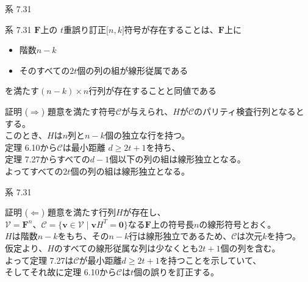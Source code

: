 \documentclass[dvipdfmx,10pt,jsarticle]{beamer}
\newcommand{\F}{\mathbf{F}}
\newcommand{\code}[1]{\mathcal{#1}}
\newcommand{\vs}[1]{\mathcal{#1}}
\newcommand{\sets}[1]{\lbrace{}  #1 \rbrace}
\newcommand{\bracket}[1]{\lbrack{} #1 \rbrack}
\renewcommand{\vec}[1]{\mathbf{#1}}
\begin{document}
  \begin{frame}{系 7.31}
    \begin{block}{系 7.31}
      $\F$上の $t$重誤り訂正$\bracket{n,k}$符号が存在することは、$\F$上に \\
      \begin{itemize}
        \item 階数$n-k$
        \item そのすべての$2t$個の列の組が線形従属である
      \end{itemize}
      を満たす$(n - k) \times n$行列が存在することと同値である
    \end{block}
    \begin{block}{証明 ($\Rightarrow$)}
      題意を満たす符号$\code{C}$が与えられ、$H$が$\code{C}$のパリティ検査行列となるとする。 \\
      このとき、$H$は$n$列と$n-k$個の独立な行を持つ。 \\
      定理 6.10から$\code{C}$は最小距離 $d \geq 2t + 1$を持ち、 \\
      定理 7.27からすべての$d - 1$個以下の列の組は線形独立となる。 \\
      よってすべての$2t$個の列の組は線形独立となる。
    \end{block}
  \end{frame}
  \begin{frame}{系 7.31}
    \begin{block}{証明 ($\Leftarrow$)}
      題意を満たす行列$H$が存在し、 \\
      $\vs{V} = \F^n$、$\code{C} = \sets{\vec{v} \in \vs{V} \mid \vec{v} H^T = \vec{0}}$なる$\F$上の符号長$n$の線形符号とおく。 \\
      $H$は階数$n-k$をもち、その$n-k$行は線形独立であるため、$\code C$は次元$k$を持つ。 \\
      仮定より、$H$のすべての線形従属な列は少なくとも$2t+1$個の列を含む。 \\
      よって定理 7.27は$\code{C}$が最小距離$d \geq 2t + 1$を持つことを示していて、\\
      そしてそれ故に定理 6.10から$\code{C}$は$t$個の誤りを訂正する。
    \end{block}
  \end{frame}
\end{document}
